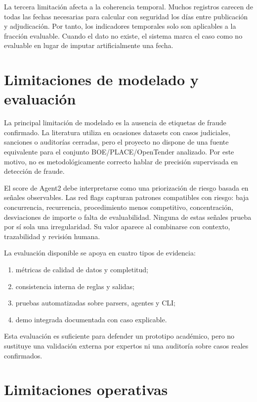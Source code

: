 \documentclass[11pt,a4paper,spanish]{book}
\numberwithin{equation}{chapter}
\numberwithin{figure}{chapter}
\begin{document}
La tercera limitaci{\'o}n afecta a la coherencia temporal. Muchos registros carecen de todas las fechas
necesarias para calcular con seguridad los d{\'i}as entre publicaci{\'o}n y adjudicaci{\'o}n. Por tanto,
los indicadores temporales solo son aplicables a la fracci{\'o}n evaluable. Cuando el dato no existe,
el sistema marca el caso como no evaluable en lugar de imputar artificialmente una fecha.

\section{Limitaciones de modelado y evaluaci{\'o}n}
\label{sec:limitaciones_modelado}

La principal limitaci{\'o}n de modelado es la ausencia de etiquetas de fraude confirmado. La literatura
utiliza en ocasiones datasets con casos judiciales, sanciones o auditor{\'i}as cerradas, pero el
proyecto no dispone de una fuente equivalente para el conjunto BOE/PLACE/OpenTender analizado. Por
este motivo, no es metodol{\'o}gicamente correcto hablar de precisi{\'o}n supervisada en detecci{\'o}n
de fraude.

El score de Agent2 debe interpretarse como una priorizaci{\'o}n de riesgo basada en se{\~n}ales
observables. Las red flags capturan patrones compatibles con riesgo: baja concurrencia, recurrencia,
procedimiento menos competitivo, concentraci{\'o}n, desviaciones de importe o falta de evaluabilidad.
Ninguna de estas se{\~n}ales prueba por s{\'i} sola una irregularidad. Su valor aparece al combinarse
con contexto, trazabilidad y revisi{\'o}n humana.

La evaluaci{\'o}n disponible se apoya en cuatro tipos de evidencia:

\begin{enumerate}
  \item m{\'e}tricas de calidad de datos y completitud;
  \item consistencia interna de reglas y salidas;
  \item pruebas automatizadas sobre parsers, agentes y CLI;
  \item demo integrada documentada con caso explicable.
\end{enumerate}

Esta evaluaci{\'o}n es suficiente para defender un prototipo acad{\'e}mico, pero no sustituye una validaci{\'o}n
externa por expertos ni una auditor{\'i}a sobre casos reales confirmados.

\section{Limitaciones operativas}
\label{sec:limitaciones_operativas}
\end{document}
